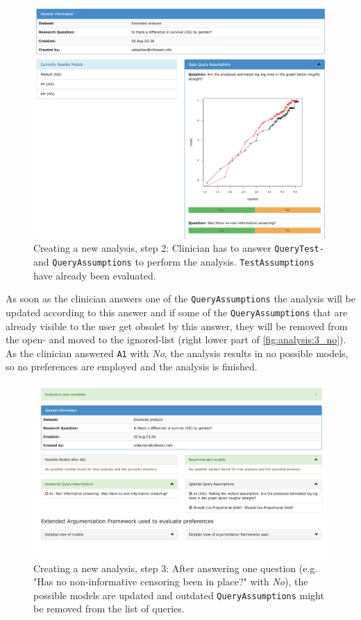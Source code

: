 \begin{figure}[t]
	\centering
	\includegraphics[width=\textwidth]{figures/ui_analysis_1}
	\caption{Creating a new analysis, step 2: Clinician has to answer \texttt{QueryTest-} and \texttt{QueryAssumptions} to perform the analysis. \texttt{TestAssumptions} have already been evaluated.}
	\label{fig:analysis:2}
\end{figure}


As soon as the clinician answers one of the \texttt{QueryAssumptions} the analysis will be updated according to this answer and if some of the \texttt{QueryAssumptions} that are already visible to the user get obsolet by this answer, they will be removed from the open- and moved to the ignored-list (right lower part of \autoref{fig:analysis:3_no}). 
As the clinician answered \texttt{A1} with \textit{No}, the analysis results in no possible models, so no preferences are employed and the analysis is finished.

\begin{figure}[t]
	\centering
	\includegraphics[width=\textwidth]{figures/ui_analysis_2_no}
	\caption{Creating a new analysis, step 3: After answering one question (e.g. "Has no non-informative censoring been in place?" with \textit{No}), the possible models are updated and outdated \texttt{QueryAssumptions} might be removed from the list of queries.}
	\label{fig:analysis:3_no}
\end{figure}

